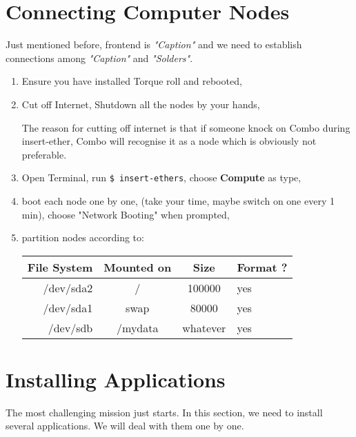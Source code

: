 \section{Connecting Computer Nodes}
Just mentioned before, frontend is {\it "Caption"} and we need to establish connections among {\it "Caption"} and {\it "Solders"}.
\begin{enumerate}
\item Ensure you have installed Torque roll and rebooted,
\item Cut off Internet, Shutdown all the nodes by your hands,
\begin{remark}
The reason for cutting off internet is that if someone knock on Combo during insert-ether, Combo will recognise it as a node which is obviously not preferable. 
\end{remark}
\item Open Terminal, run {\tt \$ insert-ethers}, choose {\bf Compute} as type,
\item boot each node one by one, (take your time, maybe switch on one every 1 min), choose "Network Booting" when prompted,
\item partition nodes according to: \\
\begin{tabular}{ r | c | c | l }
	\hline
		File System & Mounted on & Size & Format ? \\ \hline
		/dev/sda2 & / & 100000 & yes \\ \hline
		/dev/sda1 & swap & 80000 & yes \\ \hline
		/dev/sdb & /mydata & whatever & yes \\
	\hline
\end{tabular}
\end{enumerate}

\section{Installing Applications}
The most challenging mission just starts. In this section, we need to install several applications. We will deal with them one by one.

